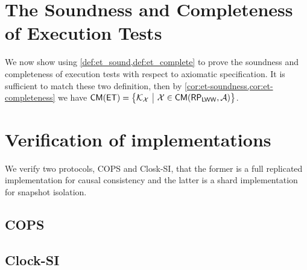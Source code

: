 \documentclass[conference,compsoc]{IEEEtran}
\newcommand{\RootPath}{.}
\begin{document}
\section{The Soundness and Completeness of Execution Tests}
\label{app:et_sound_complete}
We now show using \cref{def:et_sound,def:et_complete} to prove the soundness and completeness of execution tests with respect to axiomatic specification.
It is sufficient to match these two definition, 
then by \cref{cor:et-soundness,cor:et-completeness} we have \( \CMs(\ET) = \Setcon{\mkvs_\aexec}{\aexec \in \CMa(\RP_\LWW,\Ax)} \).
\label{sec:kv-sound-complete-proof}
\label{sec:spec-proof}











\section{Verification of implementations}
We verify two protocols, COPS and Closk-SI, that the former is a full replicated implementation for causal consistency and the latter is a shard implementation for snapshot isolation.
\subsection{COPS}
\label{sec:cops}


\subsection{Clock-SI}
\label{sec:clock-si}


\end{document}
